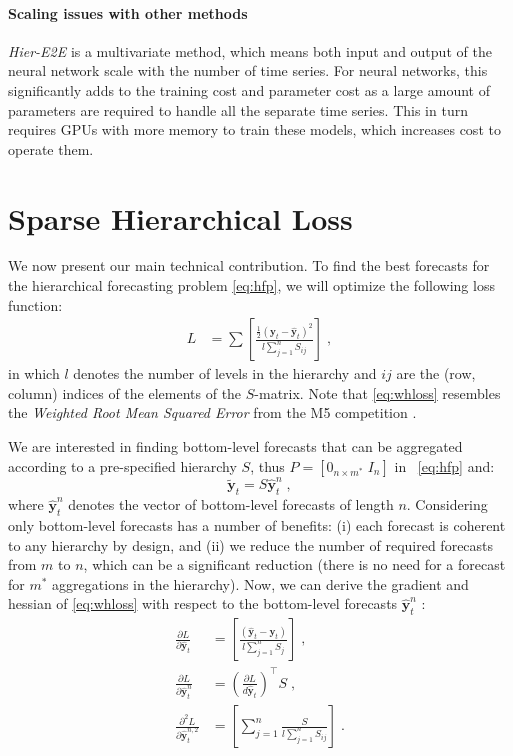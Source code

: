 \documentclass[preprint, 3p, times, twocolumn]{elsarticle}
\begin{document}
\paragraph{Scaling issues with other methods} \label{sec:scalingissuesneuralmethods} \textit{Hier-E2E} \cite{rangapuram_endtoend_2021} is a multivariate method, which means both input and output of the neural network scale with the number of time series. For neural networks, this significantly adds to the training cost and parameter cost as a large amount of parameters are required to handle all the separate time series. This in turn requires GPUs with more memory to train these models, which increases cost to operate them. 

\section{Sparse Hierarchical Loss}
We now present our main technical contribution. To find the best forecasts for the hierarchical forecasting problem \eqref{eq:hfp}, we will optimize the following loss function:
\begin{align} \label{eq:whloss}
  L &= \sum \left[ \frac{\frac{1}{2}(\textbf{y}_{t} - \hat{\textbf{y}}_{t})^2}{l \sum_{j=1}^n S_{ij}} \right] \; ,
\end{align}
in which \(l\) denotes the number of levels in the hierarchy and \(ij\) are the (row, column) indices of the elements of the \(S\)-matrix. Note that \eqref{eq:whloss} resembles the \textit{Weighted Root Mean Squared Error} from the M5 competition \cite{makridakis_m5_2022}.

We are interested in finding bottom-level forecasts that can be aggregated according to a pre-specified hierarchy \(S\), thus \(P = [0_{n \times m^*} \; I_n] \) in ~\ref{eq:hfp} and:
\begin{equation} \label{eq:hfpbu}
  \tilde{\textbf{y}}_{t} = S \hat{\textbf{y}}^n_{t} \;,
\end{equation}
where \(\hat{\textbf{y}}^n_{t}\) denotes the vector of bottom-level forecasts of length \(n\). 
Considering only bottom-level forecasts has a number of benefits: (i) each forecast is coherent to any hierarchy by design, and (ii) we reduce the number of required forecasts from \(m\) to \(n\), which can be a significant reduction (there is no need for a forecast for \(m^*\) aggregations in the hierarchy). 
Now, we can derive the gradient and hessian of \eqref{eq:whloss} with respect to the bottom-level forecasts \(\hat{\textbf{y}}^n_{t}\) : 
\begin{align} 
  \frac{\partial L}{\partial \hat{\textbf{y}}_{t}} &=  \left[ \frac{(\hat{\textbf{y}}_{t} - \textbf{y}_{t})}{l \sum_{j=1}^n S_{j}} \right] \;, \label{eq:hfp_grad} \\
  \frac{\partial L}{\partial \hat{\textbf{y}}^n_{t}} &= \left(\frac{\partial L}{d \hat{\textbf{y}}_{t}}\right)^\intercal S \;, \label{eq:hfpbu_grad}  \\
  \frac{\partial^2 L}{\partial \hat{\textbf{y}}_{t}^{n, 2}} &= \left[ \sum_{j=1}^n \frac{S}{l \sum_{j=1}^n S_{ij}} \right]\;. \label{eq:hfpbu_hess}                                               
\end{align}
\end{document}
